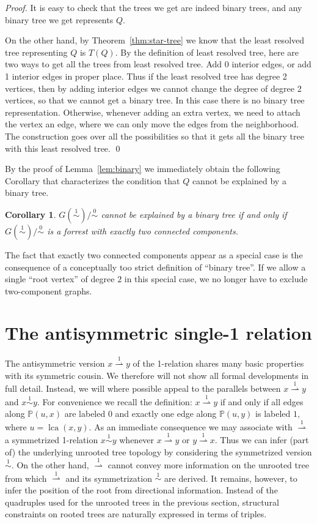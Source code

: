 \documentclass[smallextended]{svjour3}
\newcommand{\rev}[1]{\begingroup\color{blue}#1\endgroup}
\newcommand{\Ro}{\mathrel{\overset{0}{\sim}}}
\newcommand{\Rl}{\mathrel{\overset{1}{\sim}}}
\newcommand{\Rld}{\mathrel{\overset{1}{\rightharpoonup}}}
\newcommand{\lca}[1]{\mathop{lca}(#1)}
\newtheorem{cor}[thm]{Corollary}
\begin{document}
\begin{proof}
  It is easy to check that the trees we get are indeed binary trees, and
  any binary tree we get represents $Q$.
 
  On the other hand, by Theorem~\ref{thm:star-tree} we know that the least
  resolved tree representing $Q$ is $T(Q)$.  By the definition of least
  resolved tree, here are two ways to get all the trees from least resolved
  tree. Add 0 interior edges, or add 1 interior edges in proper place.
  Thus if the least resolved tree has degree 2 vertices, then by adding
  interior edges we cannot change the degree of degree 2 vertices, so that
  we cannot get a binary tree.  In this case there is no binary tree
  representation.  Otherwise, whenever adding an extra vertex, we need to
  attach the vertex an edge, where we can only move the edges from the
  neighborhood.  The construction goes over all the possibilities so that
  it gets all the binary tree with this least resolved tree. \qed
\end{proof}

By the proof of Lemma~\ref{lem:binary} we immediately obtain the following
Corollary that characterizes the condition that $Q$ cannot be explained by
a binary tree.
\begin{cor}
  $G(\Rl)/\Ro$ cannot be explained by a binary tree if and only if
  $G(\Rl)/\Ro$ \rev{is a forrest with} exactly two connected components.
\end{cor}
The fact that exactly two connected components appear as a special case is
the consequence of a conceptually too strict definition of ``binary
tree''. If we allow a single ``root vertex'' of degree $2$ in this special
case, we no longer have to exclude two-component graphs.

\section{The antisymmetric single-1 relation}
\label{sect:1dir}

The antisymmetric version $x\Rld y$ of the 1-relation shares many basic
properties with its symmetric cousin. We therefore will not show all formal
developments in full detail. Instead, we will where possible appeal to the
parallels between $x\Rld y$ and $x\Rl y$. For convenience we recall the
definition: $x \Rld y$ if and only if all edges along $\mathbb{P}(u,x)$ are
labeled $0$ and exactly one edge along $\mathbb{P}(u,y)$ is labeled $1$,
where $u=\lca{x,y}$. As an immediate consequence we may associate with
$\Rld$ a symmetrized 1-relation $x\Rl y$ whenever $x\Rld y$ or $y\Rld
x$. Thus we can infer (part of) the underlying unrooted tree topology by
considering the symmetrized version $\Rl$. On the other hand, $\Rld$ cannot
convey more information on the unrooted tree from which $\Rld$ and its
symmetrization $\Rl$ are derived. It remains, however, to infer the
position of the root from directional information. Instead of the
quadruples used for the unrooted trees in the previous section, structural
constraints on rooted trees are naturally expressed in terms of triples.
\end{document}
